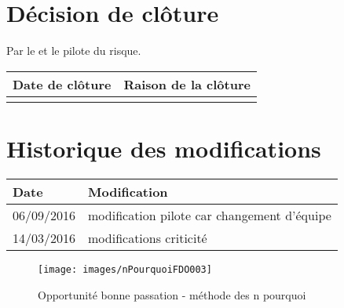 \section*{Décision de clôture}
Par le \CP{} et le pilote du risque.
\begin{table}[h]
\centering
	\begin{tabularx}{16.8cm}{|X|X|}
	\hline
	\rowcolor{gray!40} Date de clôture & Raison de la clôture \\
	\hline
	  & \\
	\hline
	\end{tabularx}
\end{table}

\section*{Historique des modifications}
\begin{table}[h]
\centering
	\begin{tabularx}{16.8cm}{|X|X|}
	\hline
	\rowcolor{gray!40} Date & Modification \\%
	\hline
	 06/09/2016 & modification pilote car changement d'équipe \\
	\hline
	 14/03/2016 & modifications criticité \\
	\hline
	\end{tabularx}
\end{table}
\newpage


\begin{figure}
	\centering
	\texttt{[image: images/nPourquoiFDO003]}
	\caption{\label{opportunite bonne passation}Opportunité bonne passation - méthode des n pourquoi}
\end{figure}
